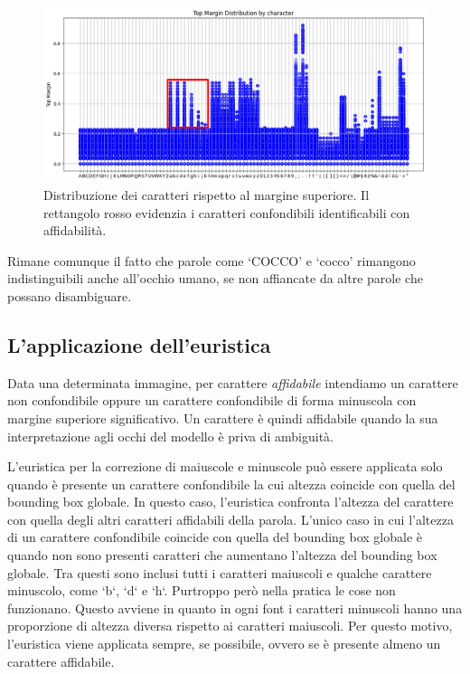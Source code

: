 \begin{figure}[H]
	\centering
	\includegraphics[width=1\textwidth]{images/top_margin_distribution_highlight.png}
	\caption{Distribuzione dei caratteri rispetto al margine superiore. Il rettangolo rosso evidenzia i caratteri confondibili identificabili con affidabilità.}
	\label{fig:top_margin_distribution_highlight.png}
\end{figure}

Rimane comunque il fatto che parole come `COCCO' e `cocco' rimangono indistinguibili anche all'occhio umano, se non affiancate da altre parole che possano disambiguare.

\subsection{L'applicazione dell'euristica}

Data una determinata immagine, per carattere \emph{affidabile} intendiamo un carattere non confondibile oppure un carattere confondibile di forma minuscola con margine superiore significativo. Un carattere è quindi affidabile quando la sua interpretazione agli occhi del modello è priva di ambiguità.

L'euristica per la correzione di maiuscole e minuscole può essere applicata solo quando è presente un carattere confondibile la cui altezza coincide con quella del bounding box globale. In questo caso, l'euristica confronta l'altezza del carattere con quella degli altri caratteri affidabili della parola.
L'unico caso in cui l'altezza di un carattere confondibile coincide con quella del bounding box globale è quando non sono presenti caratteri che aumentano l'altezza del bounding box globale. Tra questi sono inclusi tutti i caratteri maiuscoli e qualche carattere minuscolo, come `b`, `d` e `h`.
Purtroppo però nella pratica le cose non funzionano. Questo avviene in quanto in ogni font i caratteri minuscoli hanno una proporzione di altezza diversa rispetto ai caratteri maiuscoli. Per questo motivo, l'euristica viene applicata sempre, se possibile, ovvero se è presente almeno un carattere affidabile.
